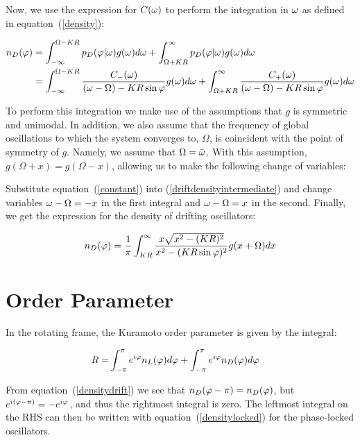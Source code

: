 Now, we use the expression for $C(\omega)$ to perform the integration in $\omega$ as defined in equation~(\ref{density}):

\begin{align}
    n_D(\varphi) &= \int_{-\infty}^{\Omega - K R} p_D(\varphi | \omega)g(\omega)d\omega +
                      \int_{\Omega + K R}^{\infty} p_D(\varphi | \omega)g(\omega)d\omega \notag\\
                   &= \int_{-\infty}^{\Omega - K R} \frac{C_-(\omega)}{(\omega - \Omega) - K R\sin\varphi}g(\omega)d\omega +
                      \int_{\Omega + K R}^{\infty} \frac{C_+(\omega)}{(\omega - \Omega) - K R\sin\varphi}g(\omega)d\omega
                      \label{driftdensityintermediate}
\end{align}

To perform this integration we make use of the assumptions that $g$ is symmetric and unimodal. In addition, we also assume that the
frequency of global oscillations to which the system converges to, $\Omega$, is coincident with the point of symmetry of $g$. Namely,
we assume that $\Omega = \bar{\omega}$. With this assumption, $g(\Omega + x) = g(\Omega - x)$, allowing us to make the following change
of variables:

Substitute equation~(\ref{constant}) into (\ref{driftdensityintermediate}) and change variables $\omega -
\Omega = -x$ in the first integral and $\omega - \Omega = x$ in the second. Finally, we get the expression for the density of drifting
oscillators:

\begin{align}
    n_D(\varphi) = \frac{1}{\pi}\int_{K R}^\infty \frac{x\sqrt{x^2 - (K R)^2}}{x^2 - (K R\sin\varphi)^2}g(x+\Omega)dx
    \label{densitydrift}
\end{align}


\section{Order Parameter}


In the rotating frame, the Kuramoto order parameter is given by the integral:

\begin{align}
    R = &\int_{-\pi}^{\pi} e^{i\varphi}n_L(\varphi)d\varphi + \int_{-\pi}^{\pi} e^{i\varphi}n_D(\varphi)d\varphi
\end{align}

From equation~(\ref{densitydrift}) we see that $n_D(\varphi - \pi) = n_D(\varphi)$, but $e^{i(\varphi - \pi)} = -e^{i\varphi}$,
and thus the rightmost integral is zero. The leftmost integral on the RHS can then be written with equation~(\ref{densitylocked}) for
the phase-locked oscillators.

